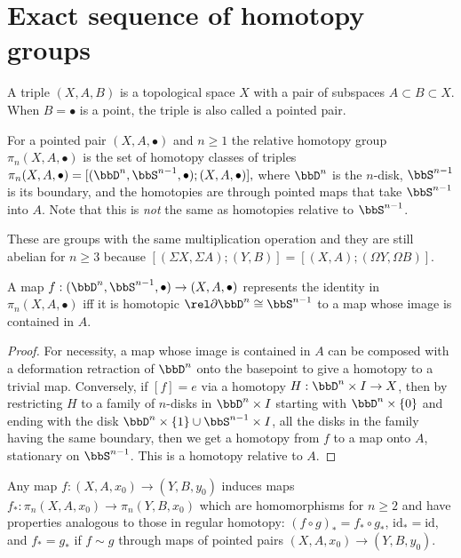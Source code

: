 \section{Exact sequence of homotopy groups}

\begin{defn}
    A triple $(X,A,B)$ is a topological space $X$ with a pair of subspaces $A\subset B\subset X$. When $B=\bullet$ is a point, the triple is also called a pointed pair.
\end{defn}

\begin{defn}
        For a pointed pair $(X,A,\bullet)$ and $n\geq 1$ the relative homotopy group $\pi_n(X,A,\bullet)$ is the set of homotopy classes of triples $\pi_n(X,A,\bullet)=[(\bbD^n,\bbS^{n-1},\bullet);(X,A,\bullet)],$
        where $\bbD^n$ is the $n$-disk, $\bbS^{n-1}$ is its boundary, and the homotopies are through pointed maps that take $\bbS^{n-1}$ into $A$. Note that this is \emph{not} the same as homotopies relative to $\bbS^{n-1}$.
\end{defn}
These are groups with the same multiplication operation and they are still abelian for $n\geq 3$ because $[(\Sigma X,\Sigma A);(Y,B)]=[( X, A);(\Omega Y,\Omega B)]$.
\begin{prop}\label{prop: compression criterion}
    A map $f:(\bbD^n,\bbS^{n-1},\bullet)\to (X,A,\bullet)$ represents the identity in $\pi_n(X,A,\bullet)$ iff it is homotopic $\rel \partial \bbD^n\cong \bbS^{n-1}$ to a map whose image is contained in $A$.
\end{prop}
\begin{proof}
    For necessity, a map whose image is contained in $A$ can be composed with a deformation retraction of $\bbD^n$ onto the basepoint to give a homotopy to a trivial map. Conversely, if $[f]=e$ via a homotopy $H:\bbD^n\times I\to X$, then by restricting $H$ to a family of $n$-disks in $\bbD^n\times I$ starting with $\bbD^n\times \{0\}$ and ending with the disk $\bbD^n\times\{1\}\cup \bbS^{n-1}\times I$, all the disks in the family having the same boundary, then we get a homotopy from $f$ to a map onto $A$, stationary on $\bbS^{n-1}$. This is a homotopy relative to $A$.
\end{proof}

Any map $f:(X,A,x_0)\to (Y,B,y_0)$ induces maps $f_\ast :\pi_n(X,A,x_0)\to \pi_n(Y,B,x_0)$ which are homomorphisms for $n\geq 2$ and have properties analogous to those in regular homotopy: $(f\circ g)_\ast=f_\ast\circ g_\ast$, $\mathrm{id}_\ast=\mathrm{id}$, and $f_\ast=g_\ast$ if $f\sim g$ through maps of pointed pairs $(X,A,x_0)\to(Y,B,y_0)$.

